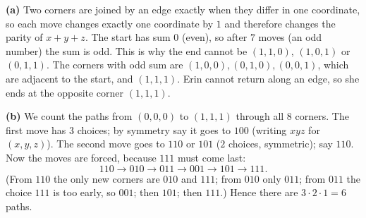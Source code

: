\textbf{(a)} Two corners are joined by an edge exactly when they differ in one coordinate, so each move changes exactly one coordinate by $1$ and therefore changes the parity of $x+y+z$. The start has sum $0$ (even), so after $7$ moves (an odd number) the sum is odd. This is why the end cannot be $(1,1,0)$, $(1,0,1)$ or $(0,1,1)$. The corners with odd sum are $(1,0,0),(0,1,0),(0,0,1)$, which are adjacent to the start, and $(1,1,1)$. Erin cannot return along an edge, so she ends at the opposite corner $(1,1,1)$.

\textbf{(b)} We count the paths from $(0,0,0)$ to $(1,1,1)$ through all $8$ corners. The first move has $3$ choices; by symmetry say it goes to $100$ (writing $xyz$ for $(x,y,z)$). The second move goes to $110$ or $101$ ($2$ choices, symmetric); say $110$. Now the moves are forced, because $111$ must come last:
\[
110\to010\to011\to001\to101\to111 .
\]
(From $110$ the only new corners are $010$ and $111$; from $010$ only $011$; from $011$ the choice $111$ is too early, so $001$; then $101$; then $111$.) Hence there are $3\cdot2\cdot1=\boxed{6}$ paths.
